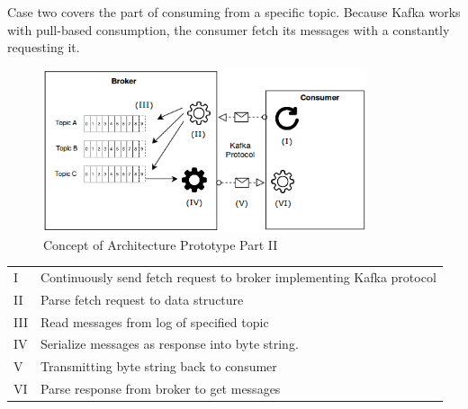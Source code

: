 Case two covers the part of consuming from a specific topic. Because Kafka works with 
pull-based consumption, the consumer fetch its messages with a constantly requesting it. 

\begin{figure}[H]
    \centering
   \includegraphics[width=0.85\textwidth]{images/concept_consumer.png}
    \caption{Concept of Architecture Prototype Part II}
    \label{fig:conept-consumer}
\end{figure}

\begin{table}[h]
\begin{tabular}{ll}
I   & Continuously send fetch request to broker implementing Kafka protocol \\
II  & Parse fetch request to data structure                                 \\
III & Read messages from log of specified topic                             \\
IV  & Serialize messages as response into byte string.                      \\
V   & Transmitting byte string back to consumer                             \\
VI  & Parse response from broker to get messages                           
\end{tabular}
\end{table}
